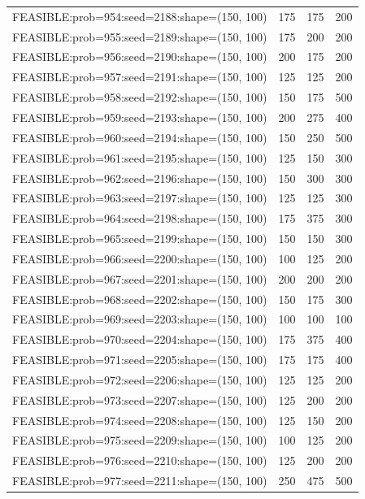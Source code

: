\begin{longtable}{lccc}
FEASIBLE:prob=954:seed=2188:shape=(150, 100) &  175 &   175 &    200 \\
FEASIBLE:prob=955:seed=2189:shape=(150, 100) &  175 &   200 &    200 \\
FEASIBLE:prob=956:seed=2190:shape=(150, 100) &  200 &   175 &    200 \\
FEASIBLE:prob=957:seed=2191:shape=(150, 100) &  125 &   125 &    200 \\
FEASIBLE:prob=958:seed=2192:shape=(150, 100) &  150 &   175 &    500 \\
FEASIBLE:prob=959:seed=2193:shape=(150, 100) &  200 &   275 &    400 \\
FEASIBLE:prob=960:seed=2194:shape=(150, 100) &  150 &   250 &    500 \\
FEASIBLE:prob=961:seed=2195:shape=(150, 100) &  125 &   150 &    300 \\
FEASIBLE:prob=962:seed=2196:shape=(150, 100) &  150 &   300 &    300 \\
FEASIBLE:prob=963:seed=2197:shape=(150, 100) &  125 &   125 &    300 \\
FEASIBLE:prob=964:seed=2198:shape=(150, 100) &  175 &   375 &    300 \\
FEASIBLE:prob=965:seed=2199:shape=(150, 100) &  150 &   150 &    300 \\
FEASIBLE:prob=966:seed=2200:shape=(150, 100) &  100 &   125 &    200 \\
FEASIBLE:prob=967:seed=2201:shape=(150, 100) &  200 &   200 &    200 \\
FEASIBLE:prob=968:seed=2202:shape=(150, 100) &  150 &   175 &    300 \\
FEASIBLE:prob=969:seed=2203:shape=(150, 100) &  100 &   100 &    100 \\
FEASIBLE:prob=970:seed=2204:shape=(150, 100) &  175 &   375 &    400 \\
FEASIBLE:prob=971:seed=2205:shape=(150, 100) &  175 &   175 &    400 \\
FEASIBLE:prob=972:seed=2206:shape=(150, 100) &  125 &   125 &    200 \\
FEASIBLE:prob=973:seed=2207:shape=(150, 100) &  125 &   200 &    200 \\
FEASIBLE:prob=974:seed=2208:shape=(150, 100) &  125 &   150 &    200 \\
FEASIBLE:prob=975:seed=2209:shape=(150, 100) &  100 &   125 &    200 \\
FEASIBLE:prob=976:seed=2210:shape=(150, 100) &  125 &   200 &    200 \\
FEASIBLE:prob=977:seed=2211:shape=(150, 100) &  250 &   475 &    500 \\

\end{longtable}
